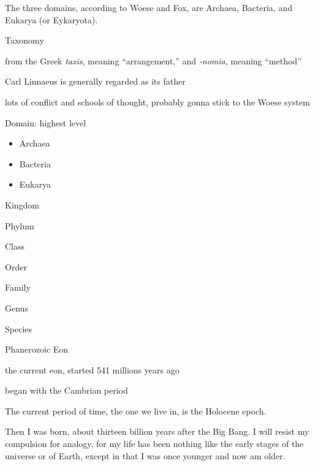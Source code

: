 \documentclass[./butidigress.tex]{subfiles}
\begin{document}
The three domains, according to Woese and Fox, are Archaea, Bacteria, and Eukarya (or Eykaryota).



\begin{somenotes}{Taxonomy}
    \item from the Greek \emph{taxis}, meaning \enquote{arrangement,} and \emph{-nomia}, meaning \enquote{method}
    \item Carl Linnaeus is generally regarded as its father
    \item lots of conflict and schools of thought, probably gonna stick to the Woese system\autocite{woeseorignial}
    \item Domain: highest level
    \begin{itemize}
        \item Archaea
        \item Bacteria
        \item Eukarya
    \end{itemize}
    \item Kingdom
    \item Phylum
    \item Class
    \item Order
    \item Family
    \item Genus
    \item Species
\end{somenotes}


\begin{somenotes}{Phanerozoic Eon}
    \item the current eon, started \num{541} millions years ago
    \item began with the Cambrian period
\end{somenotes}

The current period of time, the one we live in, is the Holocene epoch.



Then I was born, about thirteen billion years after the Big Bang.
I will resist my compulsion for analogy, for my life has been nothing like the early stages of the universe or of Earth, except in that I was once younger and now am older.

\end{document}
